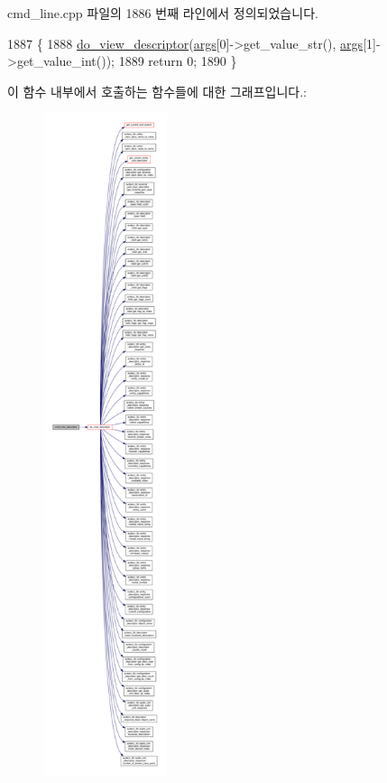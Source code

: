 cmd\+\_\+line.\+cpp 파일의 1886 번째 라인에서 정의되었습니다.


\begin{DoxyCode}
1887 \{
1888     \hyperlink{classcmd__line_aef7d9f8c4eff85c46e5b7aea0961bb51}{do\_view\_descriptor}(\hyperlink{namespaceastime__fitline_a8187411843a6284ffb964ef3fb9fcab3}{args}[0]->get\_value\_str(), \hyperlink{namespaceastime__fitline_a8187411843a6284ffb964ef3fb9fcab3}{args}[1]->get\_value\_int());
1889     \textcolor{keywordflow}{return} 0;
1890 \}
\end{DoxyCode}


이 함수 내부에서 호출하는 함수들에 대한 그래프입니다.\+:
\nopagebreak
\begin{figure}[H]
\begin{center}
\leavevmode
\includegraphics[height=550pt]{classcmd__line_abfd19a6de59d0ed6976c58b29253c403_cgraph}
\end{center}
\end{figure}




